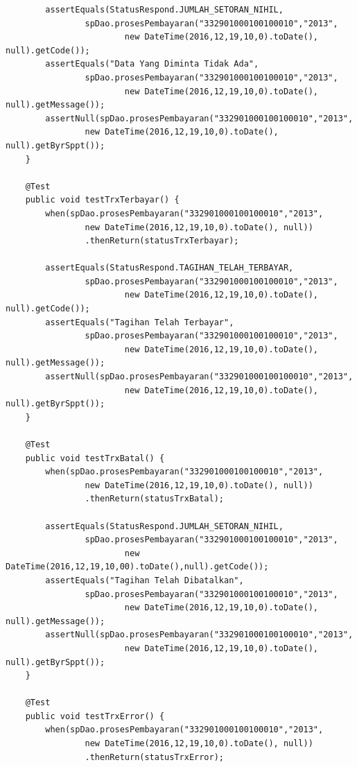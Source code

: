\documentclass[pdftex,12pt, oneside]{article}
\begin{document}
\begin{enumerate}[A.]
\begin{enumerate}[1.]
\begin{lstlisting}
        assertEquals(StatusRespond.JUMLAH_SETORAN_NIHIL,
                spDao.prosesPembayaran("332901000100100010","2013",
                        new DateTime(2016,12,19,10,0).toDate(), null).getCode());
        assertEquals("Data Yang Diminta Tidak Ada",
                spDao.prosesPembayaran("332901000100100010","2013",
                        new DateTime(2016,12,19,10,0).toDate(), null).getMessage());
        assertNull(spDao.prosesPembayaran("332901000100100010","2013",
                new DateTime(2016,12,19,10,0).toDate(), null).getByrSppt());
    }

    @Test
    public void testTrxTerbayar() {
        when(spDao.prosesPembayaran("332901000100100010","2013",
                new DateTime(2016,12,19,10,0).toDate(), null))
                .thenReturn(statusTrxTerbayar);

        assertEquals(StatusRespond.TAGIHAN_TELAH_TERBAYAR,
                spDao.prosesPembayaran("332901000100100010","2013",
                        new DateTime(2016,12,19,10,0).toDate(), null).getCode());
        assertEquals("Tagihan Telah Terbayar",
                spDao.prosesPembayaran("332901000100100010","2013",
                        new DateTime(2016,12,19,10,0).toDate(), null).getMessage());
        assertNull(spDao.prosesPembayaran("332901000100100010","2013",
                        new DateTime(2016,12,19,10,0).toDate(), null).getByrSppt());
    }

    @Test
    public void testTrxBatal() {
        when(spDao.prosesPembayaran("332901000100100010","2013",
                new DateTime(2016,12,19,10,0).toDate(), null))
                .thenReturn(statusTrxBatal);

        assertEquals(StatusRespond.JUMLAH_SETORAN_NIHIL,
                spDao.prosesPembayaran("332901000100100010","2013",
                        new DateTime(2016,12,19,10,00).toDate(),null).getCode());
        assertEquals("Tagihan Telah Dibatalkan",
                spDao.prosesPembayaran("332901000100100010","2013",
                        new DateTime(2016,12,19,10,0).toDate(), null).getMessage());
        assertNull(spDao.prosesPembayaran("332901000100100010","2013",
                        new DateTime(2016,12,19,10,0).toDate(), null).getByrSppt());
    }

    @Test
    public void testTrxError() {
        when(spDao.prosesPembayaran("332901000100100010","2013",
                new DateTime(2016,12,19,10,0).toDate(), null))
                .thenReturn(statusTrxError);


\end{lstlisting}
\end{enumerate}
\end{enumerate}
\end{document}
